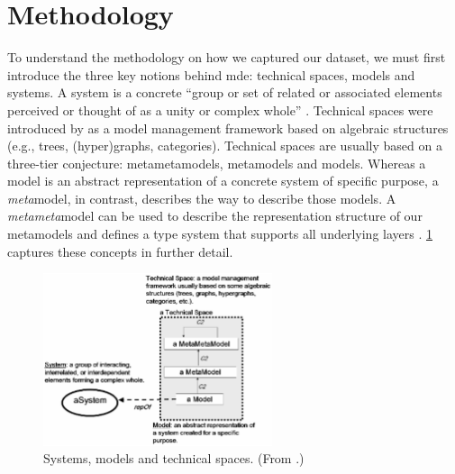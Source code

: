 \section{Methodology}
\label{sec:dataset:architecture:methodology}

To understand the methodology on how we captured our dataset, we must first introduce the three key notions behind \gls{mde}: technical spaces, models and systems. A system is a concrete ``group or set of related or associated elements perceived or thought of as a unity or complex whole'' \citep{oed:system}. Technical spaces were introduced by \citet{Bezivin:2002} as a model management framework based on algebraic structures (e.g., trees, (hyper)graphs, categories). Technical spaces are usually based on a three-tier conjecture: metametamodels, metamodels and models. Whereas a model is an abstract representation of  a concrete system of specific purpose, a \textit{meta}model, in contrast, describes the way to describe those models. A \textit{metameta}model can be used to describe the representation structure of our metamodels and defines a type system \cite{Cardelli:1985ee} that supports all underlying layers \citep{Bezivin:2006gw}. \cref{fig:dataset:bezivin2006_metamodel} captures these concepts in further detail.

\begin{figure}[h]
  \centering
  \includegraphics[width=0.6\textwidth]{images/dataset/bezivin2006_metamodel}
  \caption[An overview of systems, models and technical spaces]{Systems, models and technical spaces. (From \citep{Bezivin:2006gw}.)}
  \label{fig:dataset:bezivin2006_metamodel}
\end{figure}

